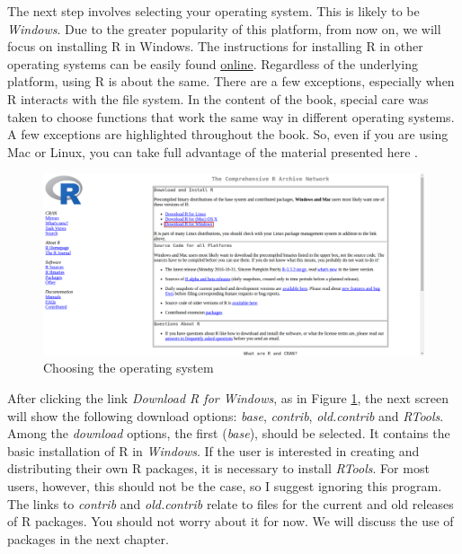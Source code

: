 \documentclass[11pt,]{book}
\begin{document}
The next step involves selecting your operating system. This is likely
to be \emph{Windows}. Due to the greater popularity of this platform,
from now on, we will focus on installing R in Windows. The instructions
for installing R in other operating systems can be easily found
\href{https://www.google.com.br/webhp?sourceid=chrome-instant\&ion=1\&espv=2\&ie=UTF-8\#q=installing+r\&*}{online}.
Regardless of the underlying platform, using R is about the same. There
are a few exceptions, especially when R interacts with the file system.
In the content of the book, special care was taken to choose functions
that work the same way in different operating systems. A few exceptions
are highlighted throughout the book. So, even if you are using Mac or
Linux, you can take full advantage of the material presented here .

\begin{figure}[!htbp]

{\centering \includegraphics[width=1\linewidth]{figs/website_cran_3} 

}

\caption{Choosing the operating system}\label{fig:website-cran-3}
\end{figure}

After clicking the link \emph{Download R for Windows}, as in Figure
\ref{fig:website-cran-3}, the next screen will show the following
download options: \emph{base}, \emph{contrib}, \emph{old.contrib} and
\emph{RTools}. Among the \emph{download} options, the first
(\emph{base}), should be selected. It contains the basic installation of
R in \emph{Windows}. If the user is interested in creating and
distributing their own R packages, it is necessary to install
\emph{RTools}. For most users, however, this should not be the case, so
I suggest ignoring this program. The links to \emph{contrib} and
\emph{old.contrib} relate to files for the current and old releases of R
packages. You should not worry about it for now. We will discuss the use
of packages in the next chapter.
\end{document}
